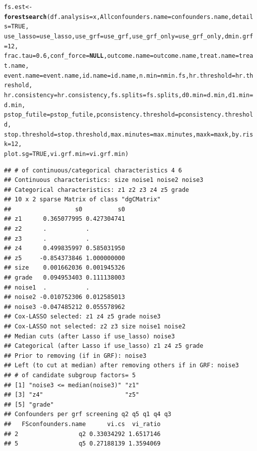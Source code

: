 \documentclass[smallextended]{svjour3}
\makeatletter
\newcommand{\hlnum}[1]{\textcolor[rgb]{0.686,0.059,0.569}{#1}}%
\newcommand{\hlstd}[1]{\textcolor[rgb]{0.345,0.345,0.345}{#1}}%
\newcommand{\hlkwa}[1]{\textcolor[rgb]{0.161,0.373,0.58}{\textbf{#1}}}%
\newcommand{\hlkwb}[1]{\textcolor[rgb]{0.69,0.353,0.396}{#1}}%
\newcommand{\hlkwc}[1]{\textcolor[rgb]{0.333,0.667,0.333}{#1}}%
\newcommand{\hlkwd}[1]{\textcolor[rgb]{0.737,0.353,0.396}{\textbf{#1}}}%
\newenvironment{kframe}{%
 \def\at@end@of@kframe{}%
 \ifinner\ifhmode%
  \def\at@end@of@kframe{\end{minipage}}%
  \begin{minipage}{\columnwidth}%
 \fi\fi%
 \def\FrameCommand##1{\hskip\@totalleftmargin \hskip-\fboxsep
 \colorbox{shadecolor}{##1}\hskip-\fboxsep
     \hskip-\linewidth \hskip-\@totalleftmargin \hskip\columnwidth}%
 \MakeFramed {\advance\hsize-\width
   \@totalleftmargin\z@ \linewidth\hsize
   \@setminipage}}%
 {\par\unskip\endMakeFramed%
 \at@end@of@kframe}
\newenvironment{knitrout}{}{} %
\makeatother
\begin{document}
\begin{knitrout}
\begin{kframe}
\begin{alltt}
\hlstd{fs.est} \hlkwb{<-} \hlkwd{forestsearch}\hlstd{(}\hlkwc{df.analysis} \hlstd{= x,} \hlkwc{Allconfounders.name} \hlstd{= confounders.name,} \hlkwc{details} \hlstd{=} \hlnum{TRUE}\hlstd{,}
    \hlkwc{use_lasso} \hlstd{= use_lasso,} \hlkwc{use_grf} \hlstd{= use_grf,} \hlkwc{use_grf_only} \hlstd{= use_grf_only,} \hlkwc{dmin.grf} \hlstd{=} \hlnum{12}\hlstd{,}
    \hlkwc{frac.tau} \hlstd{=} \hlnum{0.6}\hlstd{,} \hlkwc{conf_force} \hlstd{=} \hlkwa{NULL}\hlstd{,} \hlkwc{outcome.name} \hlstd{= outcome.name,} \hlkwc{treat.name} \hlstd{= treat.name,}
    \hlkwc{event.name} \hlstd{= event.name,} \hlkwc{id.name} \hlstd{= id.name,} \hlkwc{n.min} \hlstd{= nmin.fs,} \hlkwc{hr.threshold} \hlstd{= hr.threshold,}
    \hlkwc{hr.consistency} \hlstd{= hr.consistency,} \hlkwc{fs.splits} \hlstd{= fs.splits,} \hlkwc{d0.min} \hlstd{= d.min,} \hlkwc{d1.min} \hlstd{= d.min,}
    \hlkwc{pstop_futile} \hlstd{= pstop_futile,} \hlkwc{pconsistency.threshold} \hlstd{= pconsistency.threshold,}
    \hlkwc{stop.threshold} \hlstd{= stop.threshold,} \hlkwc{max.minutes} \hlstd{= max.minutes,} \hlkwc{maxk} \hlstd{= maxk,} \hlkwc{by.risk} \hlstd{=} \hlnum{12}\hlstd{,}
    \hlkwc{plot.sg} \hlstd{=} \hlnum{TRUE}\hlstd{,} \hlkwc{vi.grf.min} \hlstd{= vi.grf.min)}
\end{alltt}
\begin{verbatim}
## # of continuous/categorical characteristics 4 6 
## Continuous characteristics: size noise1 noise2 noise3 
## Categorical characteristics: z1 z2 z3 z4 z5 grade 
## 10 x 2 sparse Matrix of class "dgCMatrix"
##                  s0          s0
## z1      0.365077995 0.427304741
## z2      .           .          
## z3      .           .          
## z4      0.499835997 0.585031950
## z5     -0.854373846 1.000000000
## size    0.001662036 0.001945326
## grade   0.094953403 0.111138003
## noise1  .           .          
## noise2 -0.010752306 0.012585013
## noise3 -0.047485212 0.055578962
## Cox-LASSO selected: z1 z4 z5 grade noise3 
## Cox-LASSO not selected: z2 z3 size noise1 noise2 
## Median cuts (after Lasso if use_lasso) noise3 
## Categorical (after Lasso if use_lasso) z1 z4 z5 grade 
## Prior to removing (if in GRF): noise3 
## Left (to cut at median) after removing others if in GRF: noise3 
## # of candidate subgroup factors= 5 
## [1] "noise3 <= median(noise3)" "z1"                      
## [3] "z4"                       "z5"                      
## [5] "grade"                   
## Confounders per grf screening q2 q5 q1 q4 q3 
##   FSconfounders.name      vi.cs  vi_ratio
## 2                 q2 0.33034292 1.6517146
## 5                 q5 0.27188139 1.3594069

\end{verbatim}
\end{kframe}
\end{knitrout}
\end{document}
